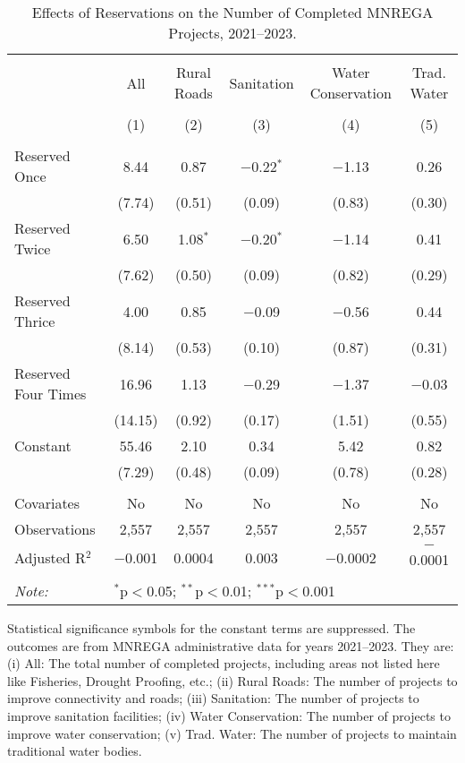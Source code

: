\begin{table}[!htbp]
\centering
\begin{threeparttable}

  \caption{Effects of Reservations on the Number of Completed MNREGA Projects, 2021--2023.} 
  \label{main_mnrega_2011_2023_dosage} 
\scriptsize 
\begin{tabular}{@{\extracolsep{0pt}}lccccc} 
\\[-1.8ex]\hline 
\hline \\[-1.8ex] 
 & All & Rural Roads & Sanitation & Water Conservation & Trad. Water \\ 
\\[-1.8ex] & (1) & (2) & (3) & (4) & (5)\\ 
\hline \\[-1.8ex] 
 Reserved Once & 8.44 & 0.87 & $-$0.22$^{*}$ & $-$1.13 & 0.26 \\ 
  & (7.74) & (0.51) & (0.09) & (0.83) & (0.30) \\ 
  Reserved Twice & 6.50 & 1.08$^{*}$ & $-$0.20$^{*}$ & $-$1.14 & 0.41 \\ 
  & (7.62) & (0.50) & (0.09) & (0.82) & (0.29) \\ 
  Reserved Thrice & 4.00 & 0.85 & $-$0.09 & $-$0.56 & 0.44 \\ 
  & (8.14) & (0.53) & (0.10) & (0.87) & (0.31) \\ 
  Reserved Four Times & 16.96 & 1.13 & $-$0.29 & $-$1.37 & $-$0.03 \\ 
  & (14.15) & (0.92) & (0.17) & (1.51) & (0.55) \\ 
  Constant & 55.46 & 2.10 & 0.34 & 5.42 & 0.82 \\ 
  & (7.29) & (0.48) & (0.09) & (0.78) & (0.28) \\ 
 \hline \\[-1.8ex] 
Covariates & No & No & No & No & No \\ 
Observations & 2,557 & 2,557 & 2,557 & 2,557 & 2,557 \\ 
Adjusted R$^{2}$ & $-$0.001 & 0.0004 & 0.003 & $-$0.0002 & $-$0.0001 \\ 
\hline 
\hline \\[-1.8ex] 
\textit{Note:}  & \multicolumn{5}{l}{$^{*}$p$<$0.05; $^{**}$p$<$0.01; $^{***}$p$<$0.001} \\ 
\end{tabular} 
\begin{tablenotes}[flushleft]
\scriptsize
\item[] Statistical significance symbols for the constant terms are suppressed. The outcomes are from MNREGA administrative data for years 2021--2023. They are: 
(i) All: The total number of completed projects, including areas not listed here like Fisheries, Drought Proofing, etc.;
(ii) Rural Roads: The number of projects to improve connectivity and roads;
(iii) Sanitation: The number of projects to improve sanitation facilities;
(iv) Water Conservation: The number of projects to improve water conservation;
(v) Trad. Water: The number of projects to maintain traditional water bodies.
\end{tablenotes}
\end{threeparttable}
\end{table}
